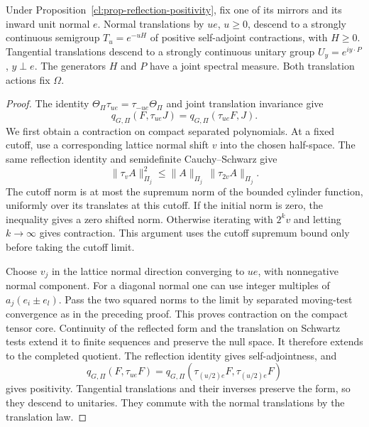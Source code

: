 \documentclass[11pt,letterpaper,reqno]{amsart}
\makeatletter
\numberwithin{equation}{section}
\theoremstyle{definition}
\newcommand{\ms@minorstart}{%
  \pushQED{\qed}\renewcommand{\qedsymbol}{$\blacksquare$}}
\newenvironment{proposition}[1][]{\ms@minorstart\ms@proposition[#1]}
  {\popQED\endms@proposition}
\theoremstyle{remark}
\makeatother
\begin{document}
\begin{proposition}[Translations on the reflection Hilbert space]
\label{cl:prop-reflection-semigroup}
Under Proposition~\ref{cl:prop-reflection-positivity}, fix one
of its mirrors and its inward unit normal \(e\).
Normal translations by \(ue\), \(u\ge0\), descend to a
strongly continuous semigroup \(T_u=e^{-uH}\) of positive
self-adjoint contractions, with \(H\ge0\).
Tangential translations descend to a strongly continuous
unitary group \(U_y=e^{iy\cdot P}\), \(y\perp e\).
The generators \(H\) and \(P\) have a joint spectral measure.
Both translation actions fix \(\Omega\).
\end{proposition}

\begin{proof}
The identity \(\Theta_\Pi\tau_{ue}=\tau_{-ue}\Theta_\Pi\)
and joint translation invariance give
\[
 q_{G,\Pi}(F,\tau_{ue}J)=q_{G,\Pi}(\tau_{ue}F,J).
\]
We first obtain a contraction on compact separated
polynomials. At a fixed cutoff, use a corresponding lattice
normal shift \(v\) into the chosen half-space. The same
reflection identity and semidefinite Cauchy--Schwarz give
\[
 \|\tau_v A\|_{\Pi_j}^2
     \le \|A\|_{\Pi_j}\,\|\tau_{2v}A\|_{\Pi_j}.
\]
The cutoff norm is at most the supremum norm of the bounded
cylinder function, uniformly over its translates at this
cutoff. If the initial norm is zero, the inequality gives
a zero shifted norm. Otherwise iterating with \(2^k v\) and
letting \(k\to\infty\) gives contraction. This argument uses
the cutoff supremum bound only before taking the cutoff limit.

Choose \(v_j\) in the lattice normal direction converging to
\(ue\), with nonnegative normal component. For a diagonal
normal one can use integer multiples of
\(a_j(e_i\pm e_l)\). Pass the two squared norms to the limit
by separated moving-test convergence as in the preceding
proof. This proves contraction on the compact tensor core.
Continuity of the reflected form and the translation on
Schwartz tests extend it to finite sequences and preserve the
null space. It therefore extends to the completed quotient.
The reflection identity gives self-adjointness, and
\[
 q_{G,\Pi}(F,\tau_{ue}F)=
 q_{G,\Pi}(\tau_{(u/2)e}F,\tau_{(u/2)e}F)
\]
gives positivity. Tangential translations and their inverses
preserve the form, so they descend to unitaries.
They commute with the normal translations by the translation law.


\end{proof}
\end{document}
